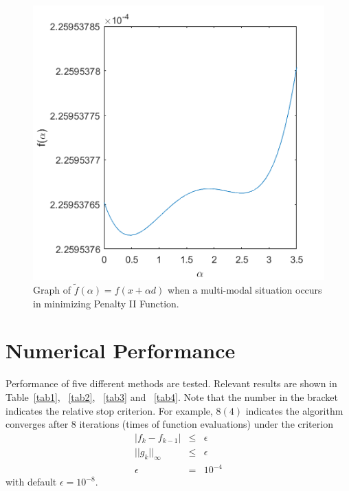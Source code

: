 \documentclass{article}
\begin{document}
\begin{figure}[ht]
\label{fig1}
\vskip 0.2in
\begin{center}
\centerline{\includegraphics[width=\columnwidth]{graph}}
\caption{Graph of $\tilde{f}(\alpha)=f(x+\alpha d)$ when a multi-modal situation occurs in minimizing Penalty II Function.}
\end{center}
\vskip -0.2in
\end{figure}

\section{Numerical Performance}

Performance of five different methods are tested. Relevant results are shown in Table~\ref{tab1}, ~\ref{tab2}, ~\ref{tab3} and ~\ref{tab4}. Note that the number in the bracket indicates the relative stop criterion. For example, $8(4)$ indicates the algorithm converges after 8 iterations (times of function evaluations) under the criterion
\begin{eqnarray*}
  |f_{k} - f_{k-1}| & \le & \epsilon \\
  ||g_{k}||_{\infty} & \le & \epsilon \\
  \epsilon & = & 10^{-4}
\end{eqnarray*}
with default $\epsilon=10^{-8}$.
\end{document}
